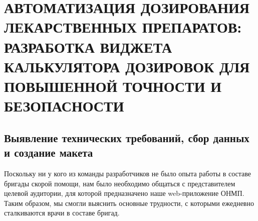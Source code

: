 \section{АВТОМАТИЗАЦИЯ ДОЗИРОВАНИЯ ЛЕКАРСТВЕННЫХ ПРЕПАРАТОВ: РАЗРАБОТКА ВИДЖЕТА КАЛЬКУЛЯТОРА ДОЗИРОВОК ДЛЯ ПОВЫШЕННОЙ ТОЧНОСТИ И БЕЗОПАСНОСТИ}
\subsection{Выявление технических требований, сбор данных и создание макета}
Поскольку ни у кого из команды разработчиков не было опыта работы в составе бригады скорой помощи, нам было необходимо общаться с представителем целевой аудитории, для которой предназначено наше web-приложение ОНМП. Таким образом, мы смогли выяснить основные трудности, с которыми ежедневно сталкиваются врачи в составе бригад.

